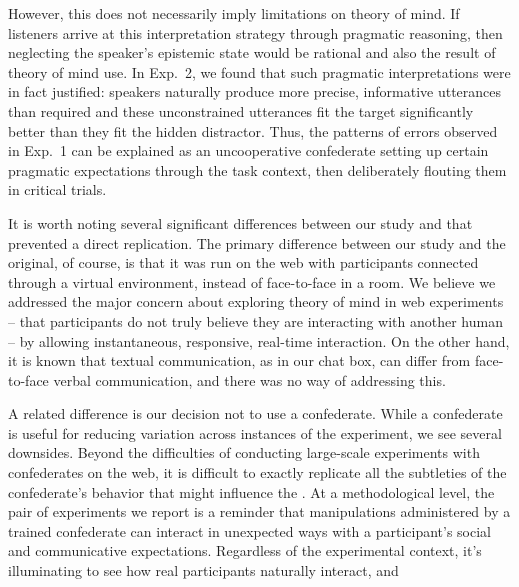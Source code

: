 \documentclass[10pt,letterpaper]{article}
\begin{document}
However, this does not necessarily imply limitations on theory of mind. If listeners arrive at this interpretation strategy through pragmatic reasoning, then neglecting the speaker's epistemic state would be rational and also the result of theory of mind use. In Exp.~2, we found that such pragmatic interpretations were in fact justified: speakers naturally produce more precise, informative utterances than required and these unconstrained utterances fit the target significantly better than they fit the hidden distractor. Thus, the patterns of errors observed in Exp.~1 can be explained as an uncooperative confederate setting up certain pragmatic expectations through the task context, then deliberately flouting them in critical trials. %

It is worth noting several significant differences between our study and  that prevented a direct replication. The primary difference between our study and the original, of course, is that it was run on the web with participants connected through a virtual environment, instead of face-to-face in a room. We believe we addressed the major concern about exploring theory of mind in web experiments -- that participants do not truly believe they are interacting with another human -- by allowing instantaneous, responsive, real-time interaction.  On the other hand, it is known that textual communication, as in our chat box, can differ from face-to-face verbal communication, and there was no way of addressing this. %

A related difference is our decision not to use a confederate. While a confederate is useful for reducing variation across instances of the experiment, we see several downsides. Beyond the difficulties of conducting large-scale experiments with confederates on the web, it is difficult to exactly replicate all the subtleties of the confederate's behavior that might influence the .  At a methodological level, the pair of experiments we report is a reminder that manipulations administered by a trained confederate can interact in unexpected ways with a participant's social and communicative expectations. Regardless of the experimental context, it's illuminating to see how real participants naturally interact, and 
\end{document}
